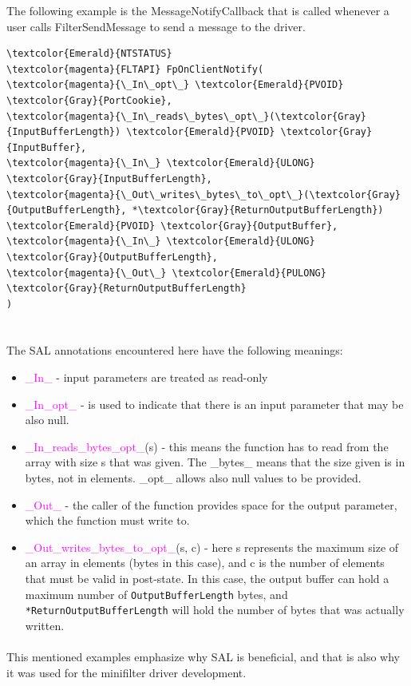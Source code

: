 		The following example is the MessageNotifyCallback that is called whenever a user calls FilterSendMessage to send a message to the driver. 
		
		\begin{Verbatim}[fontsize=\small, commandchars=\\\{\}]
\textcolor{Emerald}{NTSTATUS}
\textcolor{magenta}{FLTAPI} FpOnClientNotify(
\textcolor{magenta}{\_In\_opt\_} \textcolor{Emerald}{PVOID} \textcolor{Gray}{PortCookie},
\textcolor{magenta}{\_In\_reads\_bytes\_opt\_}(\textcolor{Gray}{InputBufferLength}) \textcolor{Emerald}{PVOID} \textcolor{Gray}{InputBuffer},
\textcolor{magenta}{\_In\_} \textcolor{Emerald}{ULONG} \textcolor{Gray}{InputBufferLength},
\textcolor{magenta}{\_Out\_writes\_bytes\_to\_opt\_}(\textcolor{Gray}{OutputBufferLength}, *\textcolor{Gray}{ReturnOutputBufferLength})
\textcolor{Emerald}{PVOID} \textcolor{Gray}{OutputBuffer},
\textcolor{magenta}{\_In\_} \textcolor{Emerald}{ULONG} \textcolor{Gray}{OutputBufferLength},
\textcolor{magenta}{\_Out\_} \textcolor{Emerald}{PULONG} \textcolor{Gray}{ReturnOutputBufferLength}
)
		
		\end{Verbatim}
		
		\newpage 
		\paragraph{}
		The SAL annotations encountered here have the following meanings:
		\begin{itemize}
			\item \textcolor{magenta}{\_In\_} - input parameters are treated as read-only 
			\item \textcolor{magenta}{\_In\_opt\_} - is used to indicate that there is an input parameter that may be also null.
			\item \textcolor{magenta}{\_In\_reads\_bytes\_opt\_}(s) - this means the function has to read from the array with size s that was given. The \_bytes\_ means that the size given is in bytes, not in elements. \_opt\_ allows also null values to be provided.
			\item \textcolor{magenta}{\_Out\_} - the caller of the function provides space for the output parameter, which the function must write to.
			\item \textcolor{magenta}{\_Out\_writes\_bytes\_to\_opt\_}(s, c) - here s represents the maximum size of an array in elements (bytes in this case), and c is the number of elements that must be valid in post-state. In this case, the output buffer can hold a maximum number of \texttt{OutputBufferLength} bytes, and \texttt{*ReturnOutputBufferLength} will hold the number of bytes that was actually written.
		\end{itemize}
		
		\paragraph{}
		This mentioned examples emphasize why SAL is beneficial, and that is also why it was used for the minifilter driver development.
	